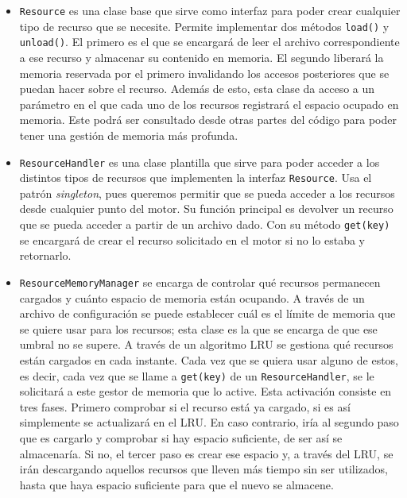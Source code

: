 \begin{itemize}
	\item \texttt{Resource} es una clase base que sirve como interfaz para poder crear cualquier tipo de recurso que se necesite. Permite implementar dos métodos \texttt{load()} y \texttt{unload()}. El primero es el que se encargará de leer el archivo correspondiente a ese recurso y almacenar su contenido en memoria. El segundo liberará la memoria reservada por el primero invalidando los accesos posteriores que se puedan hacer sobre el recurso. Además de esto, esta clase da acceso a un parámetro en el que cada uno de los recursos registrará el espacio ocupado en memoria. Este podrá ser consultado desde otras partes del código para poder tener una gestión de memoria más profunda.
	\item \texttt{ResourceHandler} es una clase plantilla que sirve para poder acceder a los distintos tipos de recursos que implementen la interfaz \texttt{Resource}. Usa el patrón \textit{singleton}, pues queremos permitir que se pueda acceder a los recursos desde cualquier punto del motor. Su función principal es devolver un recurso que se pueda acceder a partir de un archivo dado. Con su método \texttt{get(key)} se encargará de crear el recurso solicitado en el motor si no lo estaba y retornarlo. 
	\item \texttt{ResourceMemoryManager} se encarga de controlar qué recursos permanecen cargados y cuánto espacio de memoria están ocupando. A través de un archivo de configuración se puede establecer cuál es el límite de memoria que se quiere usar para los recursos; esta clase es la que se encarga de que ese umbral no se supere. A través de un algoritmo LRU se gestiona qué recursos están cargados en cada instante. Cada vez que se quiera usar alguno de estos, es decir, cada vez que se llame a \texttt{get(key)} de un \texttt{ResourceHandler}, se le solicitará a este gestor de memoria que lo active. Esta activación consiste en tres fases. Primero comprobar si el recurso está ya cargado, si es así simplemente se actualizará en el LRU. En caso contrario, iría al segundo paso que es cargarlo y comprobar si hay espacio suficiente, de ser así se almacenaría. Si no, el tercer paso es crear ese espacio y, a través del LRU, se irán descargando aquellos recursos que lleven más tiempo sin ser utilizados, hasta que haya espacio suficiente para que el nuevo se almacene.
\end{itemize}

\renewcommand{\umlfillcolor}{white}
\renewcommand{\umldrawcolor}{black}


